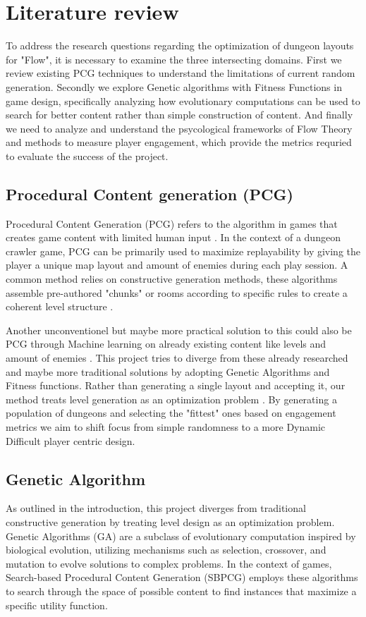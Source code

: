 \section{Literature review}

To address the research questions regarding the optimization of dungeon layouts for "Flow", it is
necessary to examine the three intersecting domains. First we review existing PCG techniques to
understand the limitations of current random generation. Secondly we explore Genetic algorithms
with Fitness Functions in game design, specifically analyzing how evolutionary computations
can be used to search for better content rather than simple construction of content. And finally
we need to analyze and understand the psycological frameworks of Flow Theory and methods to measure
player engagement, which provide the metrics requried to evaluate the success of the project.

\subsection{Procedural Content generation (PCG)}
Procedural Content Generation (PCG) refers to the algorithm in games that creates game content with
limited human input \cite{Book_PCG}. In the context of a dungeon crawler game, PCG can be primarily used 
to maximize replayability by giving the player a unique map layout and amount of enemies during 
each play session. A common method relies on constructive generation methods, these algorithms assemble
pre-authored "chunks" or rooms according to specific rules to create a coherent level structure
\cite{Book_PCG}\cite{Constructive_PCG}.

Another unconventionel but maybe more practical solution to this could also be PCG through Machine learning on
already existing content like levels and amount of enemies \cite{PCG_ML}. This project tries to
diverge from these already researched and maybe more traditional solutions by adopting
Genetic Algorithms and Fitness functions. Rather than generating a single layout and accepting it, our
method treats level generation as an optimization problem \cite{Experience_Driven_PCG}. By generating
a population of dungeons and selecting the "fittest" ones based on engagement metrics we aim to shift
focus from simple randomness to a more Dynamic Difficult player centric design.

\subsection{Genetic Algorithm}
As outlined in the introduction, this project diverges from traditional constructive generation by treating
level design as an optimization problem. Genetic Algorithms (GA) are a subclass of evolutionary computation
inspired by biological evolution, utilizing mechanisms such as selection, crossover, and mutation to evolve
solutions to complex problems. In the context of games, Search-based Procedural Content Generation (SBPCG)
employs these algorithms to search through the space of possible content to find instances that maximize
a specific utility function.

